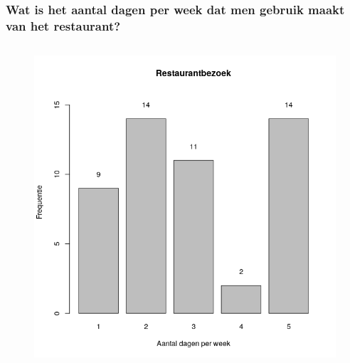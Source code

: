 \documentclass{beamer}
\begin{document}
\begin{frame}
\begin{columns}
\begin{column}{0.5\textwidth}
    \end{column}
  \end{columns}
\end{frame}

\begin{frame}
  \frametitle{Wat is het aantal dagen per week dat men gebruik maakt van het restaurant?}
  \begin{columns}
    
    \begin{column}{0.5\textwidth}
      \begin{figure}
        \centering
        \includegraphics[width=1.00\textwidth]{img/2var-barplot-aantalbezoeken}
        \label{fig:studentenbar}
      \end{figure}
    \end{column}
  

\end{columns}
\end{frame}
\end{document}
